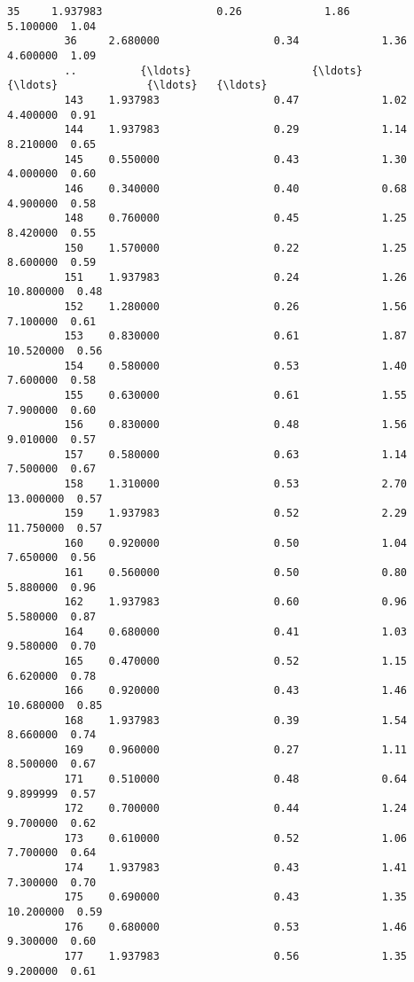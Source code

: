 \documentclass[11pt]{article}
\begin{document}
\begin{Verbatim}[commandchars=\\\{\}]
         35     1.937983                  0.26             1.86         5.100000  1.04   
         36     2.680000                  0.34             1.36         4.600000  1.09   
         ..          {\ldots}                   {\ldots}              {\ldots}              {\ldots}   {\ldots}   
         143    1.937983                  0.47             1.02         4.400000  0.91   
         144    1.937983                  0.29             1.14         8.210000  0.65   
         145    0.550000                  0.43             1.30         4.000000  0.60   
         146    0.340000                  0.40             0.68         4.900000  0.58   
         148    0.760000                  0.45             1.25         8.420000  0.55   
         150    1.570000                  0.22             1.25         8.600000  0.59   
         151    1.937983                  0.24             1.26        10.800000  0.48   
         152    1.280000                  0.26             1.56         7.100000  0.61   
         153    0.830000                  0.61             1.87        10.520000  0.56   
         154    0.580000                  0.53             1.40         7.600000  0.58   
         155    0.630000                  0.61             1.55         7.900000  0.60   
         156    0.830000                  0.48             1.56         9.010000  0.57   
         157    0.580000                  0.63             1.14         7.500000  0.67   
         158    1.310000                  0.53             2.70        13.000000  0.57   
         159    1.937983                  0.52             2.29        11.750000  0.57   
         160    0.920000                  0.50             1.04         7.650000  0.56   
         161    0.560000                  0.50             0.80         5.880000  0.96   
         162    1.937983                  0.60             0.96         5.580000  0.87   
         164    0.680000                  0.41             1.03         9.580000  0.70   
         165    0.470000                  0.52             1.15         6.620000  0.78   
         166    0.920000                  0.43             1.46        10.680000  0.85   
         168    1.937983                  0.39             1.54         8.660000  0.74   
         169    0.960000                  0.27             1.11         8.500000  0.67   
         171    0.510000                  0.48             0.64         9.899999  0.57   
         172    0.700000                  0.44             1.24         9.700000  0.62   
         173    0.610000                  0.52             1.06         7.700000  0.64   
         174    1.937983                  0.43             1.41         7.300000  0.70   
         175    0.690000                  0.43             1.35        10.200000  0.59   
         176    0.680000                  0.53             1.46         9.300000  0.60   
         177    1.937983                  0.56             1.35         9.200000  0.61   
         

\end{Verbatim}
\end{document}
